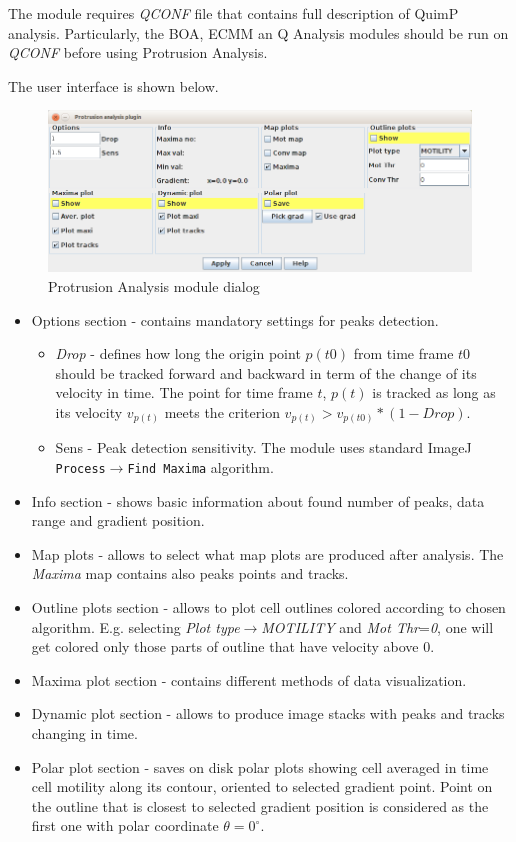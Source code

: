 \documentclass[a4paper,12pt]{article}
\begin{document}
The module requires \textit{QCONF} file that contains full description of QuimP analysis. Particularly, the BOA, ECMM an Q Analysis modules should be run on \textit{QCONF} before using Protrusion Analysis.

The user interface is shown below.

\begin{figure}[ht]
	\centering
	\includegraphics[width=16cm]{protrusion_window.png} 
	\caption{Protrusion Analysis module dialog}
	\label{fig:protrusiondialog}
\end{figure}

\begin{itemize}
	\item Options section - contains mandatory settings for peaks detection.
	\begin{itemize}
		\item \textit{Drop} - defines how long the origin point $p(t0)$ from time frame $t0$ should be tracked forward and backward in term of the change of its velocity in time. The point for time frame $t$, $p(t)$ is tracked as long as its velocity $v_{p(t)}$ meets the criterion $v_{p(t)}>v_{p(t0)}*(1-Drop)$.
		\item Sens - Peak detection sensitivity. The module uses standard ImageJ \texttt{Process$\rightarrow$Find Maxima} algorithm.
	\end{itemize} 
	\item Info section - shows basic information about found number of peaks, data range and gradient position.
	\item Map plots - allows to select what map plots are produced after analysis. The \textit{Maxima} map contains also peaks points and tracks.  
	\item Outline plots section - allows to plot cell outlines colored according to chosen algorithm. E.g. selecting \textit{Plot type}$\rightarrow$\textit{MOTILITY} and \textit{Mot Thr}=\textit{0}, one will get colored only those parts of outline that have velocity above 0.
	\item Maxima plot section - contains different methods of data visualization.
	\item Dynamic plot section - allows to produce image stacks with peaks and tracks changing in time.
	\item Polar plot section - saves on disk polar plots showing cell averaged in time cell motility along its contour, oriented to selected gradient point. Point on the outline that is closest to selected gradient position is considered as the first one with polar coordinate $\theta=0^{\circ}$.
\end{itemize}
  
\end{document}
